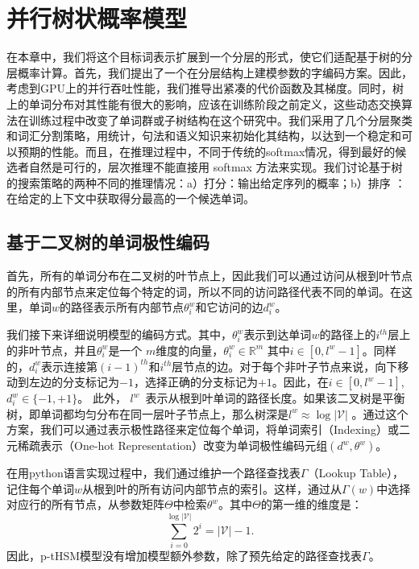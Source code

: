 \chapter{并行树状概率模型}
在本章中，我们将这个目标词表示扩展到一个分层的形式，使它们适配基于树的分层概率计算。首先，我们提出了一个在分层结构上建模参数的字编码方案。因此，考虑到GPU上的并行吞吐性能，我们推导出紧凑的代价函数及其梯度。同时，树上的单词分布对其性能有很大的影响，应该在训练阶段之前定义，这些动态交换算法在训练过程中改变了单词群或子树结构在这个研究中。我们采用了几个分层聚类和词汇分割策略，用统计，句法和语义知识来初始化其结构，以达到一个稳定和可以预期的性能。而且，在推理过程中，不同于传统的softmax情况，得到最好的候选者自然是可行的，层次推理不能直接用 softmax 方法来实现。我们讨论基于树的搜索策略的两种不同的推理情况：a）打分：输出给定序列的概率；b）排序   ：在给定的上下文中获取得分最高的一个候选单词。
\section{基于二叉树的单词极性编码}
首先，所有的单词分布在二叉树的叶节点上，因此我们可以通过访问从根到叶节点的所有内部节点来定位每个特定的词，所以不同的访问路径代表不同的单词。在这里，单词$ w $的路径表示所有内部节点$ \theta^w_i $和它访问的边$ d ^ w_i $。

我们接下来详细说明模型的编码方式。其中，$ \theta_i ^ w $表示到达单词$w$的路径上的$ i^{th} $层上的非叶节点，并且$\theta_i ^ w$是一个 $m$维度的向量，$ \theta_i ^ w \in\mathbb{R}^m $ 其中$ i \in [0, l ^ w - 1] $。同样的，$ d_i ^ w $表示连接第$(i-1)^ {th} $和$ i ^ {th} $层节点的边。对于每个非叶子节点来说，向下移动到左边的分支标记为$ -1 $，选择正确的分支标记为$ + 1 $。因此，在$i\in[0,l^w-1]$, $d_i^w\in \{-1,+1\}$。 此外， $l^w$~表示从根到叶单词的路径长度。如果该二叉树是平衡树，即单词都均匀分布在同一层叶子节点上，那么树深是$l^w\approx \log \mathcal{|V|}$ 。通过这个方案，我们可以通过表示极性路径来定位每个单词，将单词索引（Indexing）或二元稀疏表示（One-hot Representation）改变为单词极性编码元组$(d ^ w,\theta ^ w)$。


在用python语言实现过程中，我们通过维护一个路径查找表$\Gamma$（Lookup Table），记住每个单词$ w $从根到叶的所有访问内部节点的索引。这样，通过从$ \Gamma(w)$中选择对应行的所有节点，从参数矩阵${\Theta} $中检索$ \theta ^ w $。其中${\Theta} $的第一维的维度是：
\begin{equation}\label{equ:sums}
\sum_{i=0}^{\log \mathcal{|V|}}{2^i} = \mathcal{|V|} -1.
\end{equation}
因此，p-tHSM模型没有增加模型额外参数，除了预先给定的路径查找表$ \Gamma $。


